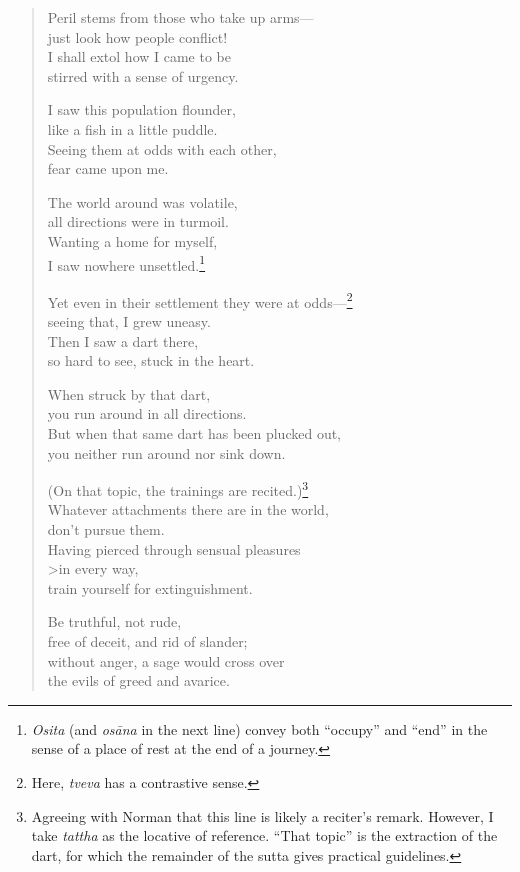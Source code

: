 \documentclass[12pt,openany]{book}%
\begin{document}
\begin{verse}%
Peril stems from those who take up arms—\\
just look how people conflict! \\
I shall extol how I came to be \\
stirred with a sense of urgency. 

I saw this population flounder, \\
like a fish in a little puddle. \\
Seeing them at odds with each other, \\
fear came upon me. 

The world around was volatile, \\
all directions were in turmoil. \\
Wanting a home for myself, \\
I saw nowhere unsettled.\footnote{\textit{Osita} (and \textit{\textsanskrit{osāna}} in the next line) convey both “occupy” and “end” in the sense of a place of rest at the end of a journey. } 

Yet even in their settlement they were at odds—\footnote{Here, \textit{tveva} has a contrastive sense. } \\
seeing that, I grew uneasy. \\
Then I saw a dart there, \\
so hard to see, stuck in the heart. 

When struck by that dart, \\
you run around in all directions. \\
But when that same dart has been plucked out, \\
you neither run around nor sink down. 

(On that topic, the trainings are recited.)\footnote{Agreeing with Norman that this line is likely a reciter’s remark. However, I take \textit{tattha} as the locative of reference. “That topic” is the extraction of the dart, for which the remainder of the sutta gives practical guidelines. } \\
Whatever attachments there are in the world, \\
don’t pursue them. \\
Having pierced through sensual pleasures \\>in every way, \\
train yourself for extinguishment. 

Be truthful, not rude, \\
free of deceit, and rid of slander; \\
without anger, a sage would cross over \\
the evils of greed and avarice. 


\end{verse}
\end{document}
